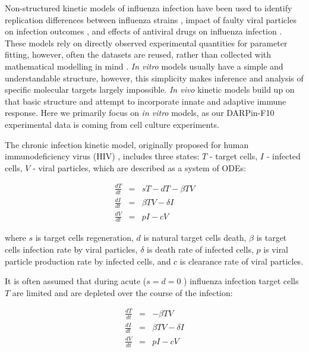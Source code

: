Non-structured kinetic models of influenza infection have been used to identify replication differences between influenza strains \cite{simon2016avian}, impact of faulty viral particles on infection outcomes \cite{frensing2013continuous}, and effects of antiviral drugs on influenza infection \cite{beauchemin2008modeling, handel2007neuraminidase, holder2011assessing}. These models rely on directly observed experimental quantities for parameter fitting, however, often the datasets are reused, rather than collected with mathematical modelling in mind \cite{boianelli2015modeling}. \textit{In vitro} models usually have a simple and understandable structure, however, this simplicity makes inference and analysis of specific molecular targets largely impossible. \textit{In vivo} kinetic models build up on that basic structure and attempt to incorporate innate \cite{beauchemin2008modeling, handel2010towards,miao2010quantifying} and adaptive \cite{belz2002compromised, handel2010towards, miao2010quantifying} immune response. Here we primarily focus on \textit{in vitro} models, as our DARPin-F10 experimental data is coming from cell culture experiments.

The chronic infection kinetic model, originally proposed for human immunodeficiency virus (HIV) \cite{perelson2002modelling}, includes three states: $T$ - target cells, $I$ - infected cells, $V$ - viral particles, which are described as a system of ODEs:

\begin{equation}
\begin{array}{rcl}
\frac{dT}{dt} &=& s T - d T - \beta T V \\
\frac{dI}{dt} &=& \beta T V - \delta I \\
\frac{dV}{dt} &=& p I - c V
\end{array}
\end{equation}

where $s$ is target cells regeneration, $d$ is natural target cells death, $\beta$ is target cells infection rate by viral particles, $\delta$ is death rate of infected cells, $p$ is viral particle production rate by infected cells, and $c$ is clearance rate of viral particles.

It is often assumed that during acute ($s = d = 0$ \cite{baccam2006kinetics}) influenza infection target cells $T$ are limited and are depleted over the course of the infection:

\begin{equation}
\begin{array}{rcl}
\frac{dT}{dt} &=& - \beta T V \\
\frac{dI}{dt} &=& \beta T V - \delta I \\
\frac{dV}{dt} &=& p I - c V
\end{array}
\end{equation}

